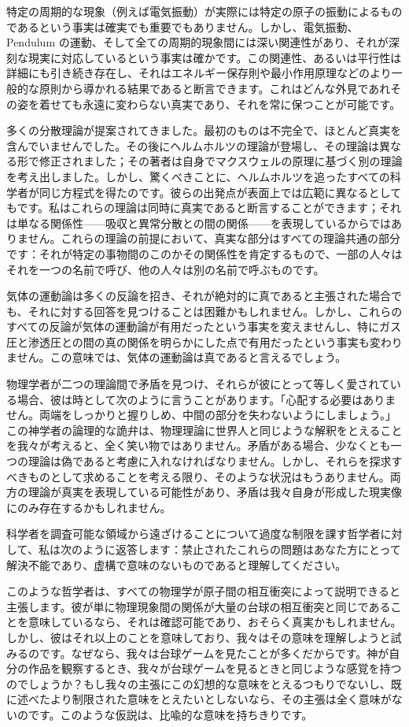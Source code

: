 \documentclass[a4paper,11pt,openany]{ltjsbook}
\begin{document}
特定の周期的な現象（例えば電気振動）が実際には特定の原子の振動によるものであるという事実は確実でも重要でもありません。しかし、電気振動、 Pendulum の運動、そして全ての周期的現象間には深い関連性があり、それが深刻な現実に対応しているという事実は確かです。この関連性、あるいは平行性は詳細にも引き続き存在し、それはエネルギー保存則や最小作用原理などのより一般的な原則から導かれる結果であると断言できます。これはどんな外見であれその姿を着せても永遠に変わらない真実であり、それを常に保つことが可能です。

多くの分散理論が提案されてきました。最初のものは不完全で、ほとんど真実を含んでいませんでした。その後にヘルムホルツの理論が登場し、その理論は異なる形で修正されました；その著者は自身でマクスウェルの原理に基づく別の理論を考え出しました。しかし、驚くべきことに、ヘルムホルツを追ったすべての科学者が同じ方程式を得たのです。彼らの出発点が表面上では広範に異なるとしてもです。私はこれらの理論は同時に真実であると断言することができます；それは単なる関係性——吸収と異常分散との間の関係——を表現しているからではありません。これらの理論の前提において、真実な部分はすべての理論共通の部分です：それが特定の事物間のこのかその関係性を肯定するもので、一部の人々はそれを一つの名前で呼び、他の人々は別の名前で呼ぶものです。

気体の運動論は多くの反論を招き、それが絶対的に真であると主張された場合でも、それに対する回答を見つけることは困難かもしれません。しかし、これらのすべての反論が気体の運動論が有用だったという事実を変えませんし、特にガス圧と渗透圧との間の真の関係を明らかにした点で有用だったという事実も変わりません。この意味では、気体の運動論は真であると言えるでしょう。

物理学者が二つの理論間で矛盾を見つけ、それらが彼にとって等しく愛されている場合、彼は時として次のように言うことがあります。「心配する必要はありません。両端をしっかりと握りしめ、中間の部分を失わないようにしましょう。」この神学者の論理的な詭弁は、物理理論に世界人と同じような解釈をとえることを我々が考えると、全く笑い物ではありません。矛盾がある場合、少なくとも一つの理論は偽であると考慮に入れなければなりません。しかし、それらを探求すべきものとして求めることを考える限り、そのような状況はもうありません。両方の理論が真実を表現している可能性があり、矛盾は我々自身が形成した現実像にのみ存在するかもしれません。

科学者を調査可能な領域から遠ざけることについて過度な制限を課す哲学者に対して、私は次のように返答します：禁止されたこれらの問題はあなた方にとって解決不能であり、虚構で意味のないものであると理解してください。

このような哲学者は、すべての物理学が原子間の相互衝突によって説明できると主張します。彼が単に物理現象間の関係が大量の台球の相互衝突と同じであることを意味しているなら、それは確認可能であり、おそらく真実かもしれません。しかし、彼はそれ以上のことを意味しており、我々はその意味を理解しようと試みるのです。なぜなら、我々は台球ゲームを見たことが多くだからです。神が自分の作品を観察するとき、我々が台球ゲームを見るときと同じような感覚を持つのでしょうか？もし我々の主張にこの幻想的な意味をとえるつもりでないし、既に述べたより制限された意味をとえたいとしないなら、その主張は全く意味がないのです。このような仮説は、比喩的な意味を持ちきりです。
\end{document}
